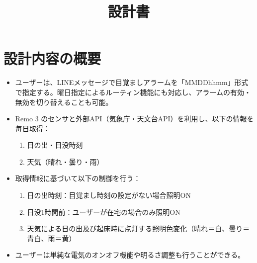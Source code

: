 \documentclass{jarticle}
\title{設計書}
\begin{document}
\date{}
\maketitle

\section*{設計内容の概要}
\begin{itemize}
    \item ユーザーは、LINEメッセージで目覚ましアラームを「MMDDhhmm」形式で指定する。曜日指定によるルーティン機能にも対応し、アラームの有効・無効を切り替えることも可能。\\
    \item Remo 3 のセンサと外部API（気象庁・天文台API）を利用し、以下の情報を毎日取得：\\
        \begin{enumerate}
            \item 日の出・日没時刻\\
            \item 天気（晴れ・曇り・雨）\\
        \end{enumerate}
    \item 取得情報に基づいて以下の制御を行う：\\
        \begin{enumerate}
            \item 日の出時刻：目覚まし時刻の設定がない場合照明ON\\
            \item 日没1時間前：ユーザーが在宅の場合のみ照明ON\\
            \item 天気による日の出及び起床時に点灯する照明色変化（晴れ＝白、曇り＝青白、雨＝黄）\\
        \end{enumerate}
    \item ユーザーは単純な電気のオンオフ機能や明るさ調整も行うことができる。
\end{itemize}
\end{document}
